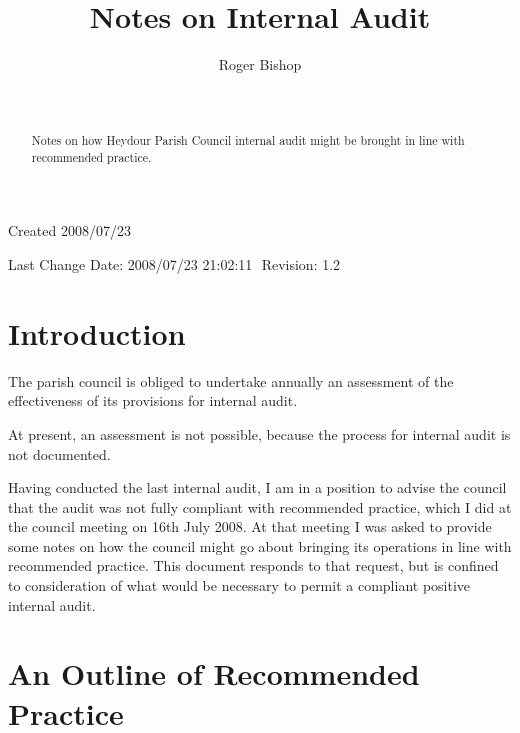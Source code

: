 \documentclass[numreferences]{rbjk}
\begin{document}
                                                                                   
\begin{article}
\begin{opening}  
\title{Notes on Internal Audit}
\author{Roger Bishop }
\date{$ $\ $ $}

\begin{abstract}
Notes on how Heydour Parish Council internal audit might be brought in line with recommended practice.
\end{abstract}

\end{opening}

\vfill

\begin{centering}
\footnotesize{
Created 2008/07/23

Last Change $ $Date: 2008/07/23 21:02:11 $ $ $ $Revision: 1.2 $ $

}%
\end{centering}

\setcounter{tocdepth}{4}
{\parskip-0pt\tableofcontents}

\section{Introduction}

The parish council is obliged to undertake annually an assessment of the effectiveness of its provisions for internal audit.

At present, an assessment is not possible, because the process for internal audit is not documented.

Having conducted the last internal audit, I am in a position to advise the council that the audit was not fully compliant with recommended practice, which I did at the council meeting on 16th July 2008.
At that meeting I was asked to provide some notes on how the council might go about bringing its operations in line with recommended practice.
This document responds to that request, but is confined to consideration of what would be necessary to permit a compliant positive internal audit.

\section{An Outline of Recommended Practice}


\end{article}
\end{document}
